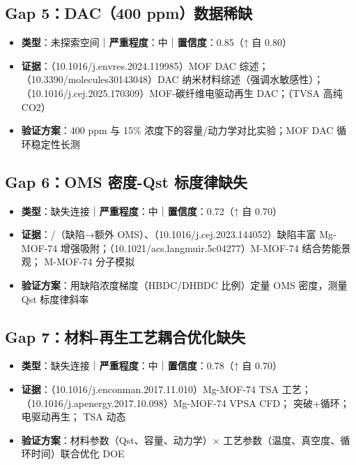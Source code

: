 \documentclass[12pt,a4paper]{ctexart}
\providecommand{\tightlist}{%
  \setlength{\itemsep}{0pt}\setlength{\parskip}{0pt}}
\begin{document}
\subsection{Gap 5：DAC（400 ppm）数据稀缺}\label{gap:gap-5dac400-ppmux6570ux636eux7a00ux7f3a}

\begin{itemize}
\tightlist
\item
  \textbf{类型}：未探索空间｜\textbf{严重程度}：中｜\textbf{置信度}：0.85（↑ 自 0.80）
\item
  \textbf{证据}：\cite{p31}（10.1016/j.envres.2024.119985）MOF DAC 综述；\cite{p50}（10.3390/molecules30143048）DAC 纳米材料综述（强调水敏感性）；\cite{p35}（10.1016/j.cej.2025.170309）MOF-碳纤维电驱动再生 DAC；\cite{p60}（TVSA 高纯 CO2）
\item
  \textbf{验证方案}：400 ppm 与 15\% 浓度下的容量/动力学对比实验；MOF DAC 循环稳定性长测
\end{itemize}

\subsection{Gap 6：OMS 密度-Qst 标度律缺失}\label{gap:gap-6oms-ux5bc6ux5ea6-qst-ux6807ux5ea6ux5f8bux7f3aux5931}

\begin{itemize}
\tightlist
\item
  \textbf{类型}：缺失连接｜\textbf{严重程度}：中｜\textbf{置信度}：0.72（↑ 自 0.70）
\item
  \textbf{证据}：\cite{p7}/\cite{p13}（缺陷→额外 OMS）、\cite{p192}（10.1016/j.cej.2023.144052）缺陷丰富 Mg-MOF-74 增强吸附；\cite{p17}（10.1021/acs.langmuir.5c04277）M-MOF-74 结合势能景观；\cite{p185} M-MOF-74 分子模拟
\item
  \textbf{验证方案}：用缺陷浓度梯度（HBDC/DHBDC 比例）定量 OMS 密度，测量 Qst 标度律斜率
\end{itemize}

\subsection{Gap 7：材料-再生工艺耦合优化缺失}\label{gap:gap-7ux6750ux6599-ux518dux751fux5de5ux827aux8026ux5408ux4f18ux5316ux7f3aux5931}

\begin{itemize}
\tightlist
\item
  \textbf{类型}：缺失连接｜\textbf{严重程度}：中｜\textbf{置信度}：0.78（↑ 自 0.70）
\item
  \textbf{证据}：\cite{p176}（10.1016/j.enconman.2017.11.010）Mg-MOF-74 TSA 工艺；\cite{p178}（10.1016/j.apenergy.2017.10.098）Mg-MOF-74 VPSA CFD；\cite{p196} 突破+循环；\cite{p35} 电驱动再生；\cite{p188} TSA 动态
\item
  \textbf{验证方案}：材料参数（Qst、容量、动力学）× 工艺参数（温度、真空度、循环时间）联合优化 DOE
\end{itemize}
\end{document}
